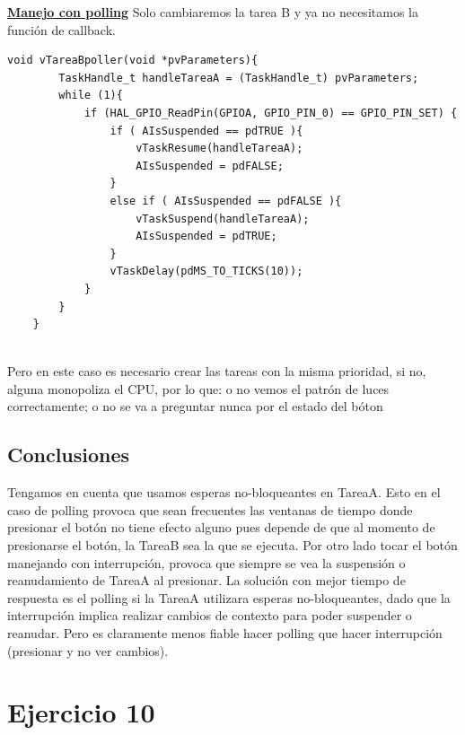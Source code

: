 \documentclass[12pt]{article}
\begin{document}
\underline{\textbf{Manejo con polling}}
Solo cambiaremos la tarea B y ya no necesitamos la función de
callback.
\begin{lstlisting}[style=CStyle]
    void vTareaBpoller(void *pvParameters){
        TaskHandle_t handleTareaA = (TaskHandle_t) pvParameters;
        while (1){
            if (HAL_GPIO_ReadPin(GPIOA, GPIO_PIN_0) == GPIO_PIN_SET) {
                if ( AIsSuspended == pdTRUE ){
                    vTaskResume(handleTareaA);
                    AIsSuspended = pdFALSE;
                }
                else if ( AIsSuspended == pdFALSE ){
                    vTaskSuspend(handleTareaA);
                    AIsSuspended = pdTRUE;
                }
                vTaskDelay(pdMS_TO_TICKS(10));
            }
        }
    }
    
\end{lstlisting}
Pero en este caso es necesario crear las tareas con la misma
prioridad, si no, alguna monopoliza el CPU, por lo que: o no vemos el patrón
de luces correctamente; o
no se va a preguntar nunca por el estado del bóton
\subsection{Conclusiones}
Tengamos en cuenta que usamos esperas no-bloqueantes en TareaA.
Esto en el caso de polling provoca que sean frecuentes
las ventanas de tiempo donde 
presionar el botón no tiene efecto alguno pues depende de que al 
momento de presionarse el botón, la TareaB sea la que se ejecuta.
Por otro lado tocar el botón manejando
con interrupción, provoca que siempre se vea la suspensión o 
reanudamiento de TareaA al presionar.
La solución con mejor tiempo de respuesta es el polling si la TareaA
utilizara esperas no-bloqueantes, dado que la interrupción implica
realizar cambios de contexto para poder suspender o reanudar.
Pero es claramente menos fiable hacer polling que hacer interrupción
(presionar y no ver cambios).

\pagebreak
\section{Ejercicio 10}
\end{document}
